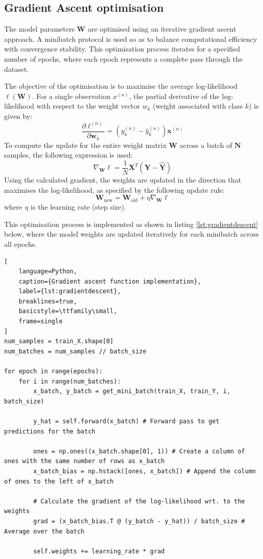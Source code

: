 \documentclass[11pt]{article}
\begin{document}
\subsection*{Gradient Ascent optimisation}
The model parameters $\mathbf{W}$ are optimised using an iterative gradient ascent approach. A minibatch protocol is used so as to balance computational efficiency with convergence stability. 
This optimisation process iterates for a specified number of epochs, where each epoch represents a complete pass through the dataset.

The objective of the optimisation is to maximise the average log-likelihood $\ell(\mathbf{W})$.
For a single observation $x^{(n)}$, the partial derivative of the log-likelihood with respect to the weight vector $w_k$ (weight associated with class $k$) 
is given by:
\begin{equation}
\frac{\partial \ell^{(n)}}{\partial \mathbf{w}_k} = \left( y_{k}^{(n)} - \hat{y}_{k}^{(n)} \right) \mathbf{x}^{(n)}
\end{equation}
To compute the update for the entire weight matrix $\mathbf{W}$ across a batch of $\mathbf{N}$ samples, the following expression is used: 
\begin{equation}
\nabla_{\mathbf{W}} \ell = \frac{1}{N} \mathbf{X}^T \left( \mathbf{Y} - \mathbf{\hat{Y}} \right)
\end{equation}
Using the calculated gradient, the weights are updated in the direction that maximises the log-likelihood, as specified by the following update rule:
\begin{equation}
\mathbf{W}_{\text{new}} = \mathbf{W}_{\text{old}} + \eta \nabla_{\mathbf{W}} \ell
\end{equation}
where $\eta$ is the learning rate (step size).

This optimisation process is implemented as shown in listing \ref{lst:gradientdescent} below, where the model weights are updated iteratively for each minibatch across all epochs.

\begin{lstlisting}[
    language=Python, 
    caption={Gradient ascent function implementation},
    label={lst:gradientdescent},
    breaklines=true,
    basicstyle=\ttfamily\small,
    frame=single
]
num_samples = train_X.shape[0]
num_batches = num_samples // batch_size 

for epoch in range(epochs):
    for i in range(num_batches):
        x_batch, y_batch = get_mini_batch(train_X, train_Y, i, batch_size)

        y_hat = self.forward(x_batch) # Forward pass to get predictions for the batch

        ones = np.ones((x_batch.shape[0], 1)) # Create a column of ones with the same number of rows as x_batch
        x_batch_bias = np.hstack([ones, x_batch]) # Append the column of ones to the left of x_batch

        # Calculate the gradient of the log-likelihood wrt. to the weights
        grad = (x_batch_bias.T @ (y_batch - y_hat)) / batch_size # Average over the batch

        self.weights += learning_rate * grad
\end{lstlisting}
\end{document}
